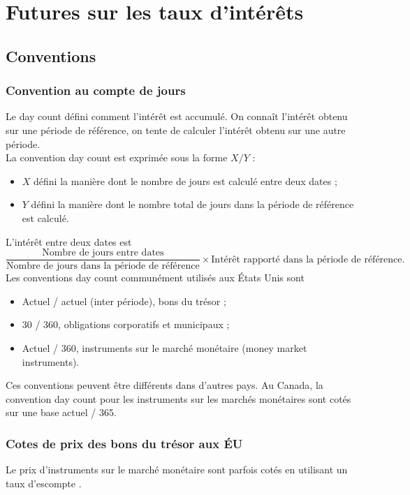 \chapter{Futures sur les taux d'intérêts}

\section{Conventions}

\subsection{Convention au compte de jours}

Le day count défini comment l'intérêt est accumulé. On connaît l'intérêt obtenu sur une période de référence, on tente de calculer l'intérêt obtenu sur une autre période. \\
La convention day count est exprimée sous la forme $X/Y$ : 
\begin{itemize}
	\item $X$ défini la manière dont le nombre de jours est calculé entre deux dates ;
	\item $Y$ défini la manière dont le nombre total de jours dans la période de référence est calculé. 
\end{itemize}
L'intérêt entre deux dates est 
$$\frac{\text{Nombre de jours entre dates}}{\text{Nombre de jours dans la période de référence}} \times \text{Intérêt rapporté dans la période de référence}.$$
Les conventions day count communément utilisés aux États Unis sont
\begin{itemize}
	\item Actuel / actuel (inter période), bons du trésor ;
	\item 30 / 360, obligations corporatifs et municipaux ;
	\item Actuel / 360, instruments sur le marché monétaire (money market instruments).
\end{itemize}
Ces conventions peuvent être différents dans d'autres pays. Au Canada, la convention day count pour les instruments sur les marchés monétaires sont cotés sur une base actuel / 365. 

\subsection{Cotes de prix des bons du trésor aux ÉU}

Le prix d'instruments sur le marché monétaire sont parfois cotés en utilisant un taux d'escompte . 

